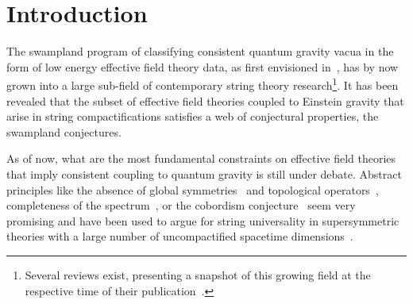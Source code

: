 \documentclass[11pt,a4paper]{article}
\numberwithin{equation}{section}
\numberwithin{table}{section}\setlength{\multlinegap}{25pt}
\begin{document}
\thispagestyle{empty}
\clearpage

\tableofcontents

\setcounter{page}{1}


\newpage

\section{Introduction}
\label{sec:intro}

The swampland program of classifying consistent quantum gravity vacua in the form of low energy effective field theory data, as first envisioned in~\cite{Vafa:2005ui,Ooguri:2006in}, has by now grown into a large sub-field of contemporary string theory research\footnote{Several reviews exist, presenting a snapshot of this growing field at the respective time of their publication~\cite{Brennan:2017rbf,Palti:2019pca,vanBeest:2021lhn,Grana:2021zvf}.}. It has been revealed that the subset of effective field theories coupled to Einstein gravity that arise in string compactifications satisfies a web of conjectural properties, the swampland conjectures.

As of now, what are the most fundamental constraints on effective field theories that imply consistent coupling to quantum gravity is still under debate. Abstract principles like the absence of global symmetries~\cite{Banks:1988yz,Kallosh:1995hi,Banks:2010zn,Harlow:2018tng,Harlow:2020bee,Chen:2020ojn,Heidenreich:2020pkc} and topological operators~\cite{Rudelius:2020orz,Heidenreich:2021tna}, completeness of the spectrum~\cite{Polchinski:2003bq}, or the cobordism conjecture~\cite{McNamara:2019rup} seem very promising and have been used to argue for string universality in supersymmetric theories with a large number of uncompactified spacetime dimensions~\cite{Cvetic:2020kuw,Montero:2020icj,Dierigl:2020lai,Hamada:2021bbz}.
\end{document}
